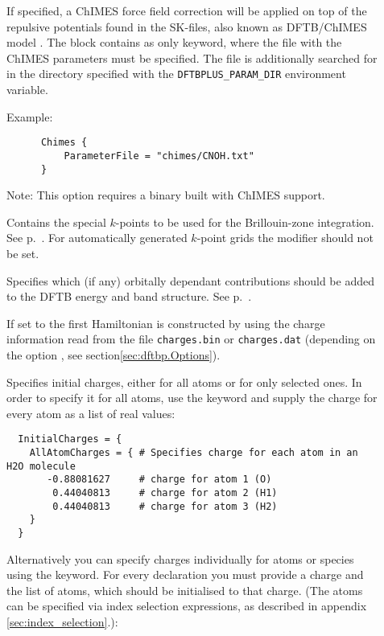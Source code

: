 \begin{description}
\item[] If specified, a ChIMES force field correction will be applied
  on top of the repulsive potentials found in the SK-files, also known as
  DFTB/ChIMES model \cite{goldman-jctc-2018}. The  block contains
   as only keyword, where the file with the ChIMES parameters
  must be specified. The file is additionally searched for in the directory
  specified with the \texttt{DFTBPLUS\_PARAM\_DIR} environment variable.

  Example:
  \begin{verbatim}
      Chimes {
          ParameterFile = "chimes/CNOH.txt"
      }
  \end{verbatim}

  Note: This option requires a {\dftbp} binary built with ChIMES support.

\item[] Contains the
  special $k$-points to be used for the Bril\-louin-zone integration.
  See p.~. For automatically generated
  $k$-point grids the modifier should not be set.

\item[] Specifies which (if any) orbitally
  dependant contributions should be added to the DFTB energy and
  band structure. See p.~.


\item[] If set to  the first Hamiltonian is
  constructed by using the charge information read from the file
  \verb|charges.bin| or \verb|charges.dat| (depending on the option
  , see section\ref{sec:dftbp.Options}).

\item[] Specifies initial charges, either for all atoms or
  for only selected ones. In order to specify it for all atoms, use the keyword
   and supply the charge for every atom as a list of real
  values:
\begin{verbatim}
  InitialCharges = {
    AllAtomCharges = { # Specifies charge for each atom in an H2O molecule
       -0.88081627     # charge for atom 1 (O)
        0.44040813     # charge for atom 2 (H1)
        0.44040813     # charge for atom 3 (H2)
    }
  }
\end{verbatim}

Alternatively you can specify charges individually for atoms or species using the 
keyword. For every  declaration you must provide a charge and the list of atoms,
which should be initialised to that charge. (The atoms can be specified via index selection
expressions, as described in appendix \ref{sec:index_selection}.):


\end{description}
